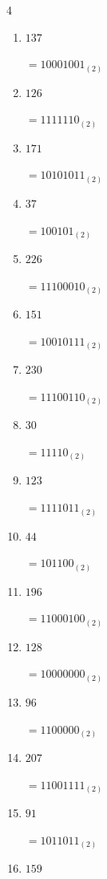 \begin{multicols}{4}
\begin{enumerate}
        $=1110100_{(2)}$

  \item $137$

        $=10001001_{(2)}$

  \item $126$

        $=1111110_{(2)}$

  \item $171$

        $=10101011_{(2)}$

  \item $37$

        $=100101_{(2)}$

  \item $226$

        $=11100010_{(2)}$

  \item $151$

        $=10010111_{(2)}$

  \item $230$

        $=11100110_{(2)}$

  \item $30$

        $=11110_{(2)}$

  \item $123$

        $=1111011_{(2)}$

  \item $44$

        $=101100_{(2)}$

  \item $196$

        $=11000100_{(2)}$

  \item $128$

        $=10000000_{(2)}$

\columnbreak %

  \item $96$

        $=1100000_{(2)}$

  \item $207$

        $=11001111_{(2)}$

  \item $91$

        $=1011011_{(2)}$

  \item $159$


\end{enumerate}
\end{multicols}
